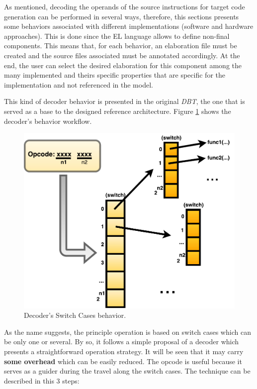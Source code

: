 As mentioned, decoding the operands of the source instructions for target code generation can be performed in several ways, therefore, this sections presents some behaviors associated with different implementations (software and hardware approaches). This is done since the EL language allows to define non-final components. This means that, for each behavior, an elaboration file must be created and the source files associated must be annotated accordingly. At the end, the user can select the desired elaboration for this component among the many implemented and theirs specific properties that are specific for the implementation and not referenced in the model.


    This kind of decoder behavior is presented in the original \textit{DBT}, the one that is served as a base to the designed reference architecture. Figure \ref{fig:Decoders_Behavior1} shows the decoder's behavior workflow.

    \begin{figure}[!htb]
        \centerline{
        \includegraphics[scale=0.5]{images/Decoders_Behavior1}
        }
        \caption{Decoder's Switch Cases behavior.}
        \label{fig:Decoders_Behavior1} 
        \end{figure}
    
     As the name suggests, the principle operation is based on switch cases which can be only one or several. By so, it follows a simple proposal of a decoder which presents a straightforward operation strategy. It will be seen that it may carry \textbf{some overhead} which can be easily reduced. The opcode is useful because it serves as a guider during the travel along the switch cases. The technique can be described in this 3 steps:
    

